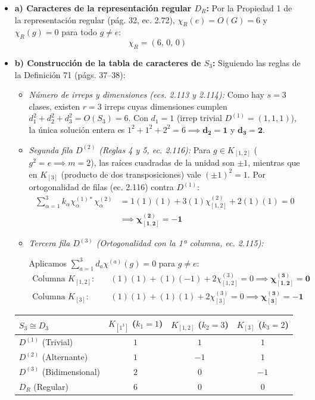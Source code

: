 \documentclass[11pt, a4paper]{article}
\begin{document}
\begin{itemize}
    \item \textbf{a) Caracteres de la representación regular $D_R$:}
    Por la Propiedad 1 de la representación regular (pág. 32, ec. 2.72), $\chi_R(e) = O(G) = 6$ y $\chi_R(g) = 0$ para todo $g \neq e$:
    \[
    \chi_R = (6, \, 0, \, 0)
    \]

    \item \textbf{b) Construcción de la tabla de caracteres de $S_3$:}
    Siguiendo las reglas de la Definición 71 (págs. 37--38):
    \begin{itemize}
        \item \textit{Número de irreps y dimensiones (ecs. 2.113 y 2.114):} Como hay $s = 3$ clases, existen $r = 3$ irreps cuyas dimensiones cumplen $d_1^2 + d_2^2 + d_3^2 = O(S_3) = 6$. Con $d_1 = 1$ (irrep trivial $D^{(1)} = (1, 1, 1)$), la única solución entera es $1^2 + 1^2 + 2^2 = 6 \implies \mathbf{d_2 = 1}$ y $\mathbf{d_3 = 2}$.
        \item \textit{Segunda fila $D^{(2)}$ (Reglas 4 y 5, ec. 2.116):} Para $g \in K_{[1,2]}$ ($g^2 = e \implies m = 2$), las raíces cuadradas de la unidad son $\pm 1$, mientras que en $K_{[3]}$ (producto de dos transposiciones) vale $(\pm 1)^2 = 1$. Por ortogonalidad de filas (ec. 2.116) contra $D^{(1)}$:
        \begin{align*}
            \sum_{\alpha=1}^3 k_\alpha \chi_\alpha^{(1)*} \chi_\alpha^{(2)}
            &= 1(1)(1) + 3(1)\chi_{[1,2]}^{(2)} + 2(1)(1) = 0 \\
            &\implies \mathbf{\chi_{[1,2]}^{(2)} = -1}
        \end{align*}
        \item \textit{Tercera fila $D^{(3)}$ (Ortogonalidad con la 1ª columna, ec. 2.115):}\par
        Aplicamos
        $\sum_{a=1}^3 d_a \chi^{(a)}(g) = 0$ para $g \neq e$:
        \begin{align*}
            \text{Columna } K_{[1,2]}: &\quad (1)(1) + (1)(-1) + 2\chi_{[1,2]}^{(3)} = 0 \implies \mathbf{\chi_{[1,2]}^{(3)} = 0} \\
            \text{Columna } K_{[3]}: &\quad (1)(1) + (1)(1) + 2\chi_{[3]}^{(3)} = 0 \implies \mathbf{\chi_{[3]}^{(3)} = -1}
        \end{align*}
    \end{itemize}

    \begin{center}
    \begin{tabular}{lccc}
    \toprule
    $S_3 \cong D_3$ & $K_{[1^3]}$ ($k_1 = 1$) & $K_{[1,2]}$ ($k_2 = 3$) & $K_{[3]}$ ($k_3 = 2$) \\
    \midrule
    $D^{(1)}$ (Trivial) & $1$ & $1$ & $1$ \\
    $D^{(2)}$ (Alternante) & $1$ & $-1$ & $1$ \\
    $D^{(3)}$ (Bidimensional) & $2$ & $0$ & $-1$ \\
    \midrule
    $D_R$ (Regular) & $6$ & $0$ & $0$ \\
    \bottomrule
    \end{tabular}
    \end{center}


\end{itemize}
\end{document}
